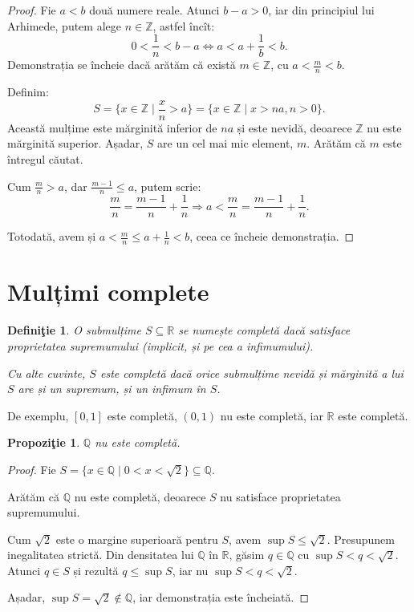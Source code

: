\documentclass[11pt,a4paper]{article}
\newcommand\seq{\subseteq}
\newcommand\RR{\mathbb{R}}
\newcommand\ZZ{\mathbb{Z}}
\newcommand\QQ{\mathbb{Q}}
\theoremstyle{dotless}
\newtheorem{proposition}{Propozi\c{t}ie}[section]
\theoremstyle{dotlessdr}
\newtheorem{definition}{Defini\c{t}ie}[section]
\begin{document}
\begin{proof}
  Fie $a < b$ două numere reale. Atunci $b - a > 0$, iar din principiul lui Arhimede,
  putem alege $n \in \ZZ$, astfel încît:
  \[
    0 < \frac{1}{n} < b - a \Leftrightarrow a < a + \frac{1}{b} < b.
  \]
  Demonstrația se încheie dacă arătăm că există $m \in \ZZ$, cu $a < \frac{m}{n} < b$.

  Definim:
  \[
    S = \{x \in \ZZ \mid \frac{x}{n} > a \} = \{x \in \ZZ \mid x > na, n > 0 \}.
  \]
  Această mulțime este mărginită inferior de $na$ și este nevidă, deoarece $\ZZ$ nu
  este mărginită superior. Așadar, $S$ are un cel mai mic element, $m$. Arătăm că $m$
  este întregul căutat.

  Cum $\frac{m}{n} > a$, dar $\frac{m - 1}{n} \leq a$, putem scrie:
  \[
    \frac{m}{n} = \frac{m - 1}{n} + \frac{1}{n} \Rightarrow %
    a < \frac{m}{n} = \frac{m - 1}{n} + \frac{1}{n}.
  \]

  Totodată, avem și $a < \frac{m}{n} \leq a + \frac{1}{n} < b$, ceea ce încheie demonstrația.
\end{proof}


\section{Mulțimi complete}
\label{sec:complete}

\begin{definition}\label{def:completa}
  O submulțime $S \seq \RR$ se numește \emph{completă} dacă satisface proprietatea supremumului
  (implicit, și pe cea a infimumului).

  Cu alte cuvinte, $S$ este completă dacă orice submulțime nevidă și mărginită a lui $S$
  are și un supremum, și un infimum \emph{în $S$}.
\end{definition}

De exemplu, $[0, 1]$ este completă, $(0, 1)$ nu este completă, iar $\RR$ este completă.

\begin{proposition}\label{pr:q-completa}
  $\QQ$ nu este completă.
\end{proposition}

\begin{proof}
  Fie $S = \{ x \in \QQ \mid 0 < x < \sqrt{2} \} \seq \QQ$.

  Arătăm că $\QQ$ nu este completă, deoarece $S$ nu satisface proprietatea supremumului.

  Cum $\sqrt{2}$ este o margine superioară pentru $S$, avem $\sup S \leq \sqrt{2}$. Presupunem
  inegalitatea strictă. Din densitatea lui $\QQ$ în $\RR$, găsim $q \in \QQ$ cu $\sup S < q < \sqrt{2}$.
  Atunci $q \in S$ și rezultă $q \leq \sup S$, iar nu $\sup S < q < \sqrt{2}$.

  Așadar, $\sup S = \sqrt{2} \notin \QQ$, iar demonstrația este încheiată.
\end{proof}
\end{document}
